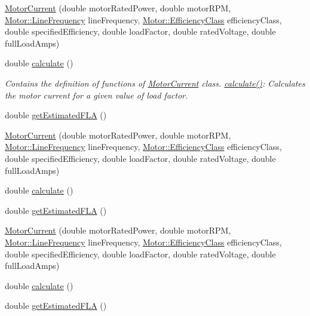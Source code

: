\begin{DoxyCompactItemize}
\item 
\hyperlink{class_motor_current_a099860ac4021ce07ec5b033b3bcf37e4}{Motor\+Current} (double motor\+Rated\+Power, double motor\+R\+PM, \hyperlink{class_motor_acee1bdf1b684ad36cb80dc2829d9fcee}{Motor\+::\+Line\+Frequency} line\+Frequency, \hyperlink{class_motor_afa022971ae062406a9f588c601673d4e}{Motor\+::\+Efficiency\+Class} efficiency\+Class, double specified\+Efficiency, double load\+Factor, double rated\+Voltage, double full\+Load\+Amps)
\item 
double \hyperlink{class_motor_current_a18e545d2c82f1fe247cc501eda2ce857}{calculate} ()
\begin{DoxyCompactList}\small\item\em Contains the definition of functions of \hyperlink{class_motor_current}{Motor\+Current} class. \hyperlink{class_motor_current_a18e545d2c82f1fe247cc501eda2ce857}{calculate()}\+: Calculates the motor current for a given value of load factor. \end{DoxyCompactList}\item 
double \hyperlink{class_motor_current_a0f845ec03585b21a8e476ed3e63f365f}{get\+Estimated\+F\+LA} ()
\item 
\hyperlink{class_motor_current_a099860ac4021ce07ec5b033b3bcf37e4}{Motor\+Current} (double motor\+Rated\+Power, double motor\+R\+PM, \hyperlink{class_motor_acee1bdf1b684ad36cb80dc2829d9fcee}{Motor\+::\+Line\+Frequency} line\+Frequency, \hyperlink{class_motor_afa022971ae062406a9f588c601673d4e}{Motor\+::\+Efficiency\+Class} efficiency\+Class, double specified\+Efficiency, double load\+Factor, double rated\+Voltage, double full\+Load\+Amps)
\item 
double \hyperlink{class_motor_current_a18e545d2c82f1fe247cc501eda2ce857}{calculate} ()
\item 
double \hyperlink{class_motor_current_a0f845ec03585b21a8e476ed3e63f365f}{get\+Estimated\+F\+LA} ()
\item 
\hyperlink{class_motor_current_a099860ac4021ce07ec5b033b3bcf37e4}{Motor\+Current} (double motor\+Rated\+Power, double motor\+R\+PM, \hyperlink{class_motor_acee1bdf1b684ad36cb80dc2829d9fcee}{Motor\+::\+Line\+Frequency} line\+Frequency, \hyperlink{class_motor_afa022971ae062406a9f588c601673d4e}{Motor\+::\+Efficiency\+Class} efficiency\+Class, double specified\+Efficiency, double load\+Factor, double rated\+Voltage, double full\+Load\+Amps)
\item 
double \hyperlink{class_motor_current_a18e545d2c82f1fe247cc501eda2ce857}{calculate} ()
\item 
double \hyperlink{class_motor_current_a0f845ec03585b21a8e476ed3e63f365f}{get\+Estimated\+F\+LA} ()
\end{DoxyCompactItemize}


